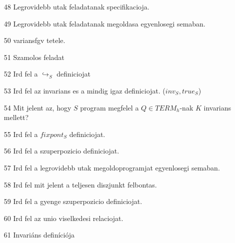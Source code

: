 \documentclass{article}
\begin{document}
\begin{enumerate}
\item[48] Legrovidebb utak feladatanak specifikacioja.
\item[49] Legrovidebb utak feladatanak megoldasa egyenlosegi semaban.
\item[50] variansfgv tetele.
\item[51] Szamolos feladat
\item[52] Ird fel a $\hookrightarrow_S$ definiciojat
\item[53] Ird fel az invarians es a mindig igaz definiciojat. ($inv_S, true_S$)
\item[54] Mit jelent az, hogy $S$ program megfelel a $Q \in TERM_h$-nak $K$ invarians mellett?
\item[55] Ird fel a $fixpont_S$ definiciojat.
\item[56] Ird fel a szuperpozicio definiciojat.
\item[57] Ird fel a legrovidebb utak megoldoprogramjat egyenlosegi semaban.
\item[58] Ird fel mit jelent a teljesen diszjunkt felbontas.
\item[59] Ird fel a gyenge szuperpozicio definiciojat.
\item[60] Ird fel az unio viselkedesi relaciojat.
\item[61] Invariáns definíciója
\end{enumerate}
\end{document}
